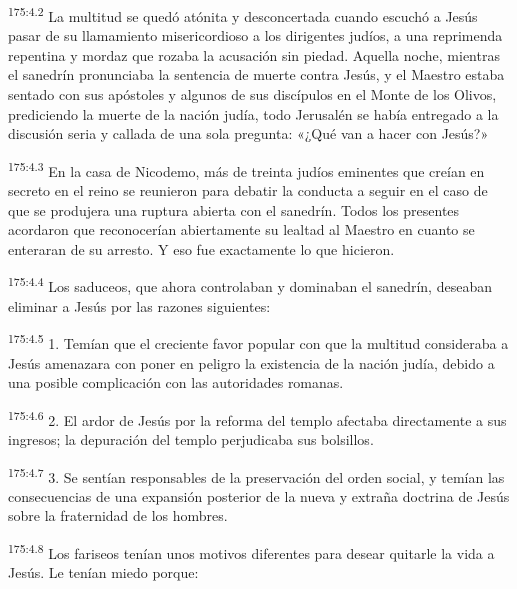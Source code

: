 \par 
\textsuperscript{175:4.2} La multitud se quedó atónita y desconcertada cuando escuchó a Jesús pasar de su llamamiento misericordioso a los dirigentes judíos, a una reprimenda repentina y mordaz que rozaba la acusación sin piedad. Aquella noche, mientras el sanedrín pronunciaba la sentencia de muerte contra Jesús, y el Maestro estaba sentado con sus apóstoles y algunos de sus discípulos en el Monte de los Olivos, prediciendo la muerte de la nación judía, todo Jerusalén se había entregado a la discusión seria y callada de una sola pregunta: «¿Qué van a hacer con Jesús?»

\par 
\textsuperscript{175:4.3} En la casa de Nicodemo, más de treinta judíos eminentes que creían en secreto en el reino se reunieron para debatir la conducta a seguir en el caso de que se produjera una ruptura abierta con el sanedrín. Todos los presentes acordaron que reconocerían abiertamente su lealtad al Maestro en cuanto se enteraran de su arresto. Y eso fue exactamente lo que hicieron.

\par 
\textsuperscript{175:4.4} Los saduceos, que ahora controlaban y dominaban el sanedrín, deseaban eliminar a Jesús por las razones siguientes:

\par 
\textsuperscript{175:4.5} 1. Temían que el creciente favor popular con que la multitud consideraba a Jesús amenazara con poner en peligro la existencia de la nación judía, debido a una posible complicación con las autoridades romanas.

\par 
\textsuperscript{175:4.6} 2. El ardor de Jesús por la reforma del templo afectaba directamente a sus ingresos; la depuración del templo perjudicaba sus bolsillos.

\par 
\textsuperscript{175:4.7} 3. Se sentían responsables de la preservación del orden social, y temían las consecuencias de una expansión posterior de la nueva y extraña doctrina de Jesús sobre la fraternidad de los hombres.

\par 
\textsuperscript{175:4.8} Los fariseos tenían unos motivos diferentes para desear quitarle la vida a Jesús. Le tenían miedo porque:

